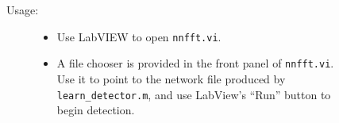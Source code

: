 \documentclass[10pt,letterpaper]{article}
\begin{document}
\begin{description}
\begin{description}
\begin{description}
\begin{itemize}
      \end{itemize}
    \item[Usage:]\hfill
      \begin{itemize}
      \item Use LabVIEW to open {\tt nnfft.vi}.
        \item A file chooser is provided in the front panel of {\tt nnfft.vi}.  Use it to point to the network file
      produced by {\tt learn\_detector.m}, and use LabView's ``Run''
      button to begin detection.
      \end{itemize}
    \end{description}
  \end{description}
  
\end{description}


\end{document}
